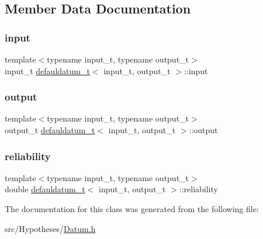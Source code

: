 \subsection{Member Data Documentation}
\mbox{\label{classdefauldatum__t_a282269cf029cd4068c94db8c8edee01e}} 
\subsubsection{\texorpdfstring{input}{input}}
{\footnotesize\ttfamily template$<$typename input\+\_\+t, typename output\+\_\+t$>$ \\
input\+\_\+t \hyperlink{classdefauldatum__t}{defauldatum\+\_\+t}$<$ input\+\_\+t, output\+\_\+t $>$\+::input}

\mbox{\label{classdefauldatum__t_abe0955067e70651670dfe3031eda1efb}} 
\subsubsection{\texorpdfstring{output}{output}}
{\footnotesize\ttfamily template$<$typename input\+\_\+t, typename output\+\_\+t$>$ \\
output\+\_\+t \hyperlink{classdefauldatum__t}{defauldatum\+\_\+t}$<$ input\+\_\+t, output\+\_\+t $>$\+::output}

\mbox{\label{classdefauldatum__t_a113548381865b87bd1332d8c73e56608}} 
\subsubsection{\texorpdfstring{reliability}{reliability}}
{\footnotesize\ttfamily template$<$typename input\+\_\+t, typename output\+\_\+t$>$ \\
double \hyperlink{classdefauldatum__t}{defauldatum\+\_\+t}$<$ input\+\_\+t, output\+\_\+t $>$\+::reliability}



The documentation for this class was generated from the following file\+:\begin{DoxyCompactItemize}
\item 
src/\+Hypotheses/\hyperlink{_datum_8h}{Datum.\+h}\end{DoxyCompactItemize}
